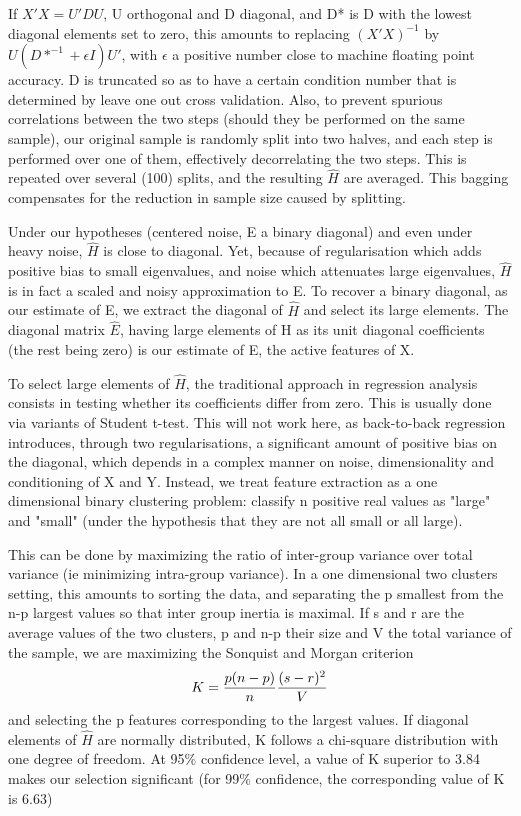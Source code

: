 \documentclass{article}
\begin{document}
If $X'X=U'DU$, U orthogonal and D diagonal, and D* is D with the lowest diagonal elements set to zero, this amounts to replacing $(X'X)^{-1}$ by $U(D*^{-1}+\epsilon I)U'$, with $\epsilon$ a positive number close to machine floating point accuracy. D is truncated so as to have a certain condition number that is determined by leave one out cross validation.
%
Also, to prevent spurious correlations between the two steps (should they be performed on the same sample), our original sample is randomly split into two halves, and each step is performed over one of them, effectively decorrelating the two steps.
%
This is repeated over several (100) splits, and the resulting $\hat H$ are averaged.
%
This bagging compensates for the reduction in sample size caused by splitting.

Under our hypotheses (centered noise, E a binary diagonal) and even under heavy noise, $\hat H$ is close to diagonal.
%
Yet, because of regularisation which adds positive bias to small eigenvalues, and noise which attenuates large eigenvalues, $\hat H$ is in fact a scaled and noisy approximation to E.
%
To recover a binary diagonal, as our estimate of E, we extract the diagonal of $\hat H$ and select its large elements.
%
The diagonal matrix $\hat E$, having large elements of H as its unit diagonal coefficients (the rest being zero) is our estimate of E, the active features of X.

To select large elements of $\hat H$, the traditional approach in regression analysis consists in testing whether its coefficients differ from zero. This is usually done via variants of Student t-test.
%
This will not work here, as back-to-back regression introduces, through two regularisations, a significant amount of positive bias on the diagonal, which depends in a complex manner on noise, dimensionality and conditioning of X and Y.
%
Instead, we treat feature extraction as a one dimensional binary clustering problem: classify n positive real values as "large" and "small" (under the hypothesis that they are not all small or all large).

This can be done by maximizing the ratio of inter-group variance over total variance (ie minimizing intra-group variance).
%
In a one dimensional two clusters setting, this amounts to sorting the data, and separating the p smallest from the n-p largest values so that inter group inertia is maximal.
%
If s and r are the average values of the two clusters, p and n-p their size and V the total variance of the sample, we are maximizing the Sonquist and Morgan criterion $$K = {p (n-p) \over n} {(s-r)^2 \over V}$$ and selecting the p features corresponding to the largest values.
%
If diagonal elements of $\hat H$ are normally distributed, K follows a chi-square distribution with one degree of freedom.
%
At 95\% confidence level, a value of K superior to 3.84 makes our selection significant (for 99\% confidence, the corresponding value of K is 6.63) \citep{Kass_75}
\end{document}
